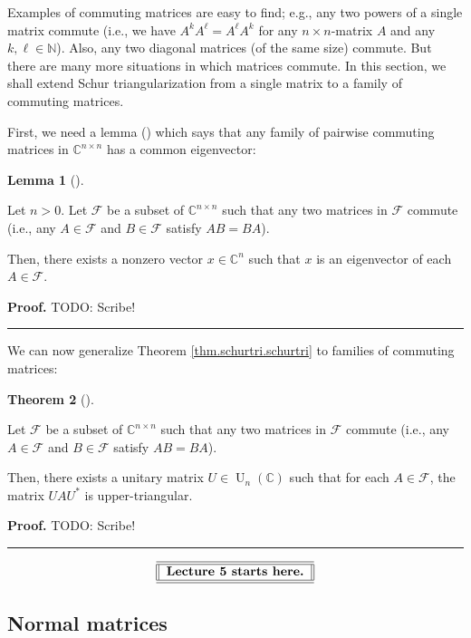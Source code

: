 \documentclass[numbers=enddot,12pt,final,onecolumn,notitlepage]{scrartcl}%
\numberwithin{exer}{subsection}
\theoremstyle{definition}
\newtheorem{theo}{Theorem}[subsection]
\newenvironment{theorem}[1][]
{\begin{theo}[#1]\begin{leftbar}}
{\end{leftbar}\end{theo}}
\newtheorem{lem}[theo]{Lemma}
\newenvironment{lemma}[1][]
{\begin{lem}[#1]\begin{leftbar}}
{\end{leftbar}\end{lem}}
\newenvironment{proof}[1][Proof]{\noindent\textbf{#1.} }{\ \rule{0.5em}{0.5em}}
\begin{document}
Examples of commuting matrices are easy to find; e.g., any two powers of a
single matrix commute (i.e., we have $A^{k}A^{\ell}=A^{\ell}A^{k}$ for any
$n\times n$-matrix $A$ and any $k,\ell\in\mathbb{N}$). Also, any two diagonal
matrices (of the same size) commute. But there are many more situations in
which matrices commute. In this section, we shall extend Schur
triangularization from a single matrix to a family of commuting matrices.

First, we need a lemma (\cite[Lemma 1.3.19]{HorJoh13}) which says that any
family of pairwise commuting matrices in $\mathbb{C}^{n\times n}$ has a common eigenvector:

\begin{lemma}
\label{lem.schurtri.commute.1}Let $n>0$. Let $\mathcal{F}$ be a subset of
$\mathbb{C}^{n\times n}$ such that any two matrices in $\mathcal{F}$ commute
(i.e., any $A\in\mathcal{F}$ and $B\in\mathcal{F}$ satisfy $AB=BA$).

Then, there exists a nonzero vector $x\in\mathbb{C}^{n}$ such that $x$ is an
eigenvector of each $A\in\mathcal{F}$.
\end{lemma}

\begin{proof}
TODO: Scribe!
\end{proof}

We can now generalize Theorem \ref{thm.schurtri.schurtri} to families of
commuting matrices:

\begin{theorem}
\label{thm.schurtri.commute.schurtri}Let $\mathcal{F}$ be a subset of
$\mathbb{C}^{n\times n}$ such that any two matrices in $\mathcal{F}$ commute
(i.e., any $A\in\mathcal{F}$ and $B\in\mathcal{F}$ satisfy $AB=BA$).

Then, there exists a unitary matrix $U\in\operatorname*{U}\nolimits_{n}\left(
\mathbb{C}\right)  $ such that for each $A\in\mathcal{F}$, the matrix
$UAU^{\ast}$ is upper-triangular.
\end{theorem}

\begin{proof}
TODO: Scribe!
\end{proof}

%

\[%
\begin{tabular}
[c]{||l||}\hline\hline
\textbf{Lecture 5 starts here.}\\\hline\hline
\end{tabular}
\]


\subsection{Normal matrices}
\end{document}
